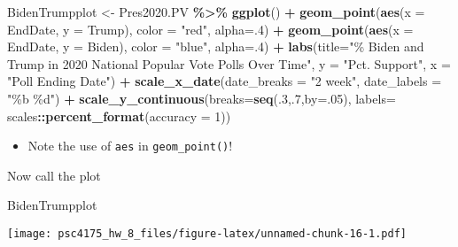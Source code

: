 \documentclass[
]{article}
\newenvironment{Shaded}{\begin{snugshade}}{\end{snugshade}}
\newcommand{\AttributeTok}[1]{\textcolor[rgb]{0.13,0.29,0.53}{#1}}
\newcommand{\DecValTok}[1]{\textcolor[rgb]{0.00,0.00,0.81}{#1}}
\newcommand{\FunctionTok}[1]{\textcolor[rgb]{0.13,0.29,0.53}{\textbf{#1}}}
\newcommand{\NormalTok}[1]{#1}
\newcommand{\OtherTok}[1]{\textcolor[rgb]{0.56,0.35,0.01}{#1}}
\newcommand{\SpecialCharTok}[1]{\textcolor[rgb]{0.81,0.36,0.00}{\textbf{#1}}}
\newcommand{\StringTok}[1]{\textcolor[rgb]{0.31,0.60,0.02}{#1}}
\providecommand{\tightlist}{%
  \setlength{\itemsep}{0pt}\setlength{\parskip}{0pt}}
\begin{document}
\begin{Shaded}
\begin{Highlighting}[]
\NormalTok{BidenTrumpplot }\OtherTok{\textless{}{-}}\NormalTok{ Pres2020.PV }\SpecialCharTok{\%\textgreater{}\%}
  \FunctionTok{ggplot}\NormalTok{()  }\SpecialCharTok{+}
  \FunctionTok{geom\_point}\NormalTok{(}\FunctionTok{aes}\NormalTok{(}\AttributeTok{x =}\NormalTok{ EndDate, }\AttributeTok{y =}\NormalTok{ Trump), }
             \AttributeTok{color =} \StringTok{"red"}\NormalTok{, }\AttributeTok{alpha=}\NormalTok{.}\DecValTok{4}\NormalTok{)  }\SpecialCharTok{+}
  \FunctionTok{geom\_point}\NormalTok{(}\FunctionTok{aes}\NormalTok{(}\AttributeTok{x =}\NormalTok{ EndDate, }\AttributeTok{y =}\NormalTok{ Biden), }
             \AttributeTok{color =} \StringTok{"blue"}\NormalTok{, }\AttributeTok{alpha=}\NormalTok{.}\DecValTok{4}\NormalTok{) }\SpecialCharTok{+}
  \FunctionTok{labs}\NormalTok{(}\AttributeTok{title=}\StringTok{"\% Biden and Trump in 2020 National Popular Vote Polls Over Time"}\NormalTok{,}
       \AttributeTok{y =} \StringTok{"Pct. Support"}\NormalTok{,}
       \AttributeTok{x =} \StringTok{"Poll Ending Date"}\NormalTok{) }\SpecialCharTok{+}
  \FunctionTok{scale\_x\_date}\NormalTok{(}\AttributeTok{date\_breaks =} \StringTok{"2 week"}\NormalTok{, }\AttributeTok{date\_labels =} \StringTok{"\%b \%d"}\NormalTok{) }\SpecialCharTok{+} 
  \FunctionTok{scale\_y\_continuous}\NormalTok{(}\AttributeTok{breaks=}\FunctionTok{seq}\NormalTok{(.}\DecValTok{3}\NormalTok{,.}\DecValTok{7}\NormalTok{,}\AttributeTok{by=}\NormalTok{.}\DecValTok{05}\NormalTok{),}
                     \AttributeTok{labels=}\NormalTok{ scales}\SpecialCharTok{::}\FunctionTok{percent\_format}\NormalTok{(}\AttributeTok{accuracy =} \DecValTok{1}\NormalTok{)) }
\end{Highlighting}
\end{Shaded}

\begin{itemize}
\tightlist
\item
  Note the use of \texttt{aes} in \texttt{geom\_point()}!
\end{itemize}

Now call the plot

\begin{Shaded}
\begin{Highlighting}[]
\NormalTok{BidenTrumpplot}
\end{Highlighting}
\end{Shaded}

\texttt{[image: psc4175\_hw\_8\_files/figure-latex/unnamed-chunk-16-1.pdf]}
\end{document}
